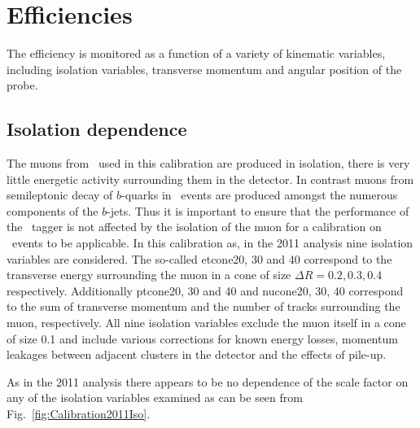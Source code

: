 \section{Efficiencies} \label{sec:CalibrationEfficiencies}

The efficiency is monitored as a function of a variety of kinematic variables, including isolation variables, transverse momentum and angular position of the probe.

\subsection{Isolation dependence} \label{sec:CalibrationEfficienciesIsolation}

The muons from \jpsi\ used in this calibration are produced in isolation, there is very little energetic activity surrounding them in the detector. In contrast muons from semileptonic decay of $b$-quarks in \ttbar\ events are produced amongst the numerous components of the $b$-jets. Thus it is important to ensure that the performance of the \xsm\ tagger is not affected by the isolation of the muon for a calibration on \jpsi\ events to be applicable. In this calibration as, in the 2011 analysis nine isolation variables are considered. The so-called etcone20, 30 and 40 correspond to the transverse energy surrounding the muon in a cone of size $\Delta R=0.2,0.3,0.4$ respectively. Additionally ptcone20, 30 and 40 and nucone20, 30, 40 correspond to the sum of transverse momentum and the number of tracks surrounding the muon, respectively. All nine isolation variables exclude the muon itself in a cone of size 0.1 and include various corrections for known energy losses, momentum leakages between adjacent clusters in the detector and the effects of pile-up.

As in the 2011 analysis there appears to be no dependence of the scale factor on any of the isolation variables examined as can be seen from Fig.~\ref{fig:Calibration2011Iso}.

